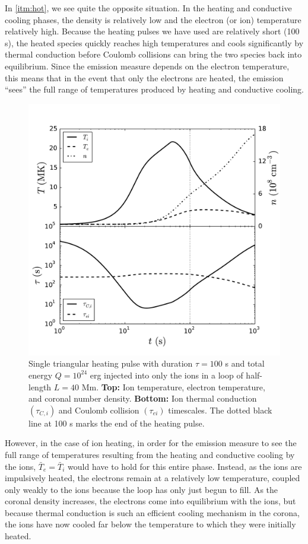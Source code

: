 \documentclass[apj]{emulateapj}
\begin{document}
	\par In \autoref{itm:hot}, we see quite the opposite situation. In the heating and conductive cooling phases, the density is relatively low and the electron (or ion) temperature relatively high. Because the heating pulses we have used are relatively short (100 s), the heated species quickly reaches high temperatures and cools significantly by thermal conduction before Coulomb collisions can bring the two species back into equilibrium. Since the emission measure depends on the electron temperature, this means that in the event that only the electrons are heated, the emission  ``sees'' the full range of temperatures produced by heating and conductive cooling.
	\begin{figure}[t]
		\centering
		\includegraphics[width=\columnwidth]{figures/ion_ts_compare.pdf}
		\caption{Single triangular heating pulse with duration $\tau=100$ s and total energy $Q=10^{24}$ erg injected into only the ions in a loop of half-length $L=40$ Mm. \textbf{Top:} Ion temperature, electron temperature, and coronal number density. \textbf{Bottom:} Ion thermal conduction $(\tau_{C,i})$ and Coulomb collision $(\tau_{ei})$ timescales. The dotted black line at 100 s marks the end of the heating pulse.}
		\label{fig:ion_ts}
	\end{figure}
	\par However, in the case of ion heating, in order for the emission measure to see the full range of temperatures resulting from the heating and conductive cooling by the ions, $\bar{T}_e=\bar{T}_i$ would have to hold for this entire phase. Instead, as the ions are impulsively heated, the electrons remain at a relatively low temperature, coupled only weakly to the ions because the loop has only just begun to fill. As the coronal density increases, the electrons come into equilibrium with the ions, but because thermal conduction is such an efficient cooling mechanism in the corona, the ions have now cooled far below the temperature to which they were initially heated. 
\end{document}
